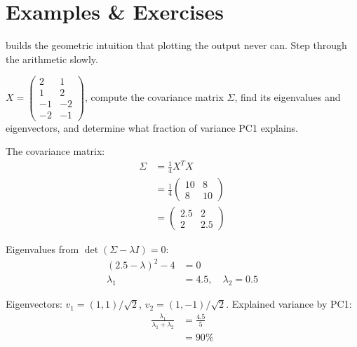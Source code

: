 
\newpage

\section{Examples \& Exercises}

 builds the geometric intuition that plotting the output never can.
Step through the arithmetic slowly.

\vspace{1em}

$X = \begin{pmatrix} 2 & 1 \\ 1 & 2 \\ -1 & -2 \\ -2 & -1 \end{pmatrix}$,
compute the covariance matrix $\Sigma$, find its eigenvalues and eigenvectors, and determine what fraction of variance PC1 explains.

The covariance matrix:
\begin{align*}
    \Sigma &= \frac{1}{4} X^T X \\
           &= \frac{1}{4} \begin{pmatrix} 10 & 8 \\ 8 & 10 \end{pmatrix} \\
           &= \begin{pmatrix} 2.5 & 2 \\ 2 & 2.5 \end{pmatrix}
\end{align*}

Eigenvalues from $\det(\Sigma - \lambda I) = 0$:
\begin{align*}
    (2.5 - \lambda)^2 - 4 &= 0 \\
    \lambda_1 &= 4.5, \quad \lambda_2 = 0.5
\end{align*}

Eigenvectors: $v_1 = (1,1)/\sqrt{2}$, $v_2 = (1,-1)/\sqrt{2}$.
Explained variance by PC1:
\begin{align*}
    \frac{\lambda_1}{\lambda_1 + \lambda_2} &= \frac{4.5}{5} \\
                                             &= 90\%
\end{align*}

